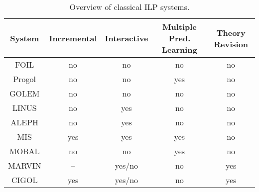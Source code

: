 \begin{table}[t]
\begin{tabular}{|c|c|c|c|c|}
\hline
System & Incremental & Interactive & Multiple Pred. Learning & Theory Revision \\
\hline
FOIL & no & no & no & no \\
Progol & no & no & yes & no \\
GOLEM & no & no & no & no \\
LINUS & no & yes & no & no \\
ALEPH & no & yes & no & no \\
MIS & yes & yes & yes & no \\
MOBAL & no & no & yes & no \\
MARVIN & -- & yes/no & no & yes \\
CIGOL & yes & yes/no & no & yes \\
\hline
\end{tabular}
\caption{Overview of classical ILP systems.}
\label{tab:ilp}
\end{table}
